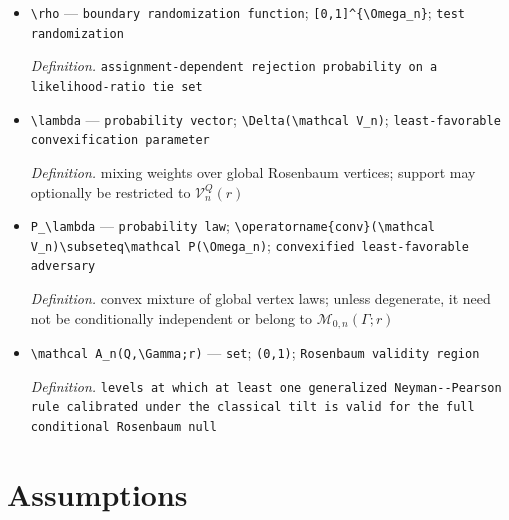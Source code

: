 \documentclass{article}
\begin{document}
\begin{itemize}
  \par\smallskip\noindent\emph{Definition.} \texttt{likelihood-\allowbreak{}ratio cutoff}
  \item \texttt{\textbackslash{}\allowbreak{}rho} --- \texttt{boundary randomization function}; \texttt{[0,\allowbreak{}1]\textasciicircum{}\{\textbackslash{}\allowbreak{}Omega\_\allowbreak{}n\}\allowbreak{}}; \texttt{test randomization}
  \par\smallskip\noindent\emph{Definition.} \texttt{assignment-\allowbreak{}dependent rejection probability on a likelihood-\allowbreak{}ratio tie set}
  \item \texttt{\textbackslash{}\allowbreak{}lambda} --- \texttt{probability vector}; \texttt{\textbackslash{}\allowbreak{}Delta(\textbackslash{}\allowbreak{}mathcal V\_\allowbreak{}n)}; \texttt{least-\allowbreak{}favorable convexification parameter}
  \par\smallskip\noindent\emph{Definition.} mixing weights over global Rosenbaum vertices; support may optionally be restricted to \(\mathcal V_n^Q(r)\)
  \item \texttt{P\_\allowbreak{}\textbackslash{}\allowbreak{}lambda} --- \texttt{probability law}; \texttt{\textbackslash{}\allowbreak{}operatorname\{conv\}\allowbreak{}(\textbackslash{}\allowbreak{}mathcal V\_\allowbreak{}n)\textbackslash{}\allowbreak{}subseteq\textbackslash{}\allowbreak{}mathcal P(\textbackslash{}\allowbreak{}Omega\_\allowbreak{}n)}; \texttt{convexified least-\allowbreak{}favorable adversary}
  \par\smallskip\noindent\emph{Definition.} convex mixture of global vertex laws; unless degenerate, it need not be conditionally independent or belong to \(\mathcal M_{0,n}(\Gamma;r)\)
  \item \texttt{\textbackslash{}\allowbreak{}mathcal A\_\allowbreak{}n(Q,\allowbreak{}\textbackslash{}\allowbreak{}Gamma;\allowbreak{}r)} --- \texttt{set}; \texttt{(0,\allowbreak{}1)}; \texttt{Rosenbaum validity region}
  \par\smallskip\noindent\emph{Definition.} \texttt{levels at which at least one generalized Neyman-\allowbreak{}-\allowbreak{}Pearson rule calibrated under the classical tilt is valid for the full conditional Rosenbaum null}
\end{itemize}

\section{Assumptions}
\end{document}
